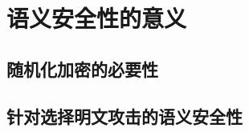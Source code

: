 \section{语义安全性的意义}\label{sec:11-3}

\subsection{随机化加密的必要性}\label{subsec:11-3-1}

\subsection{针对选择明文攻击的语义安全性}\label{subsec:11-3-2}